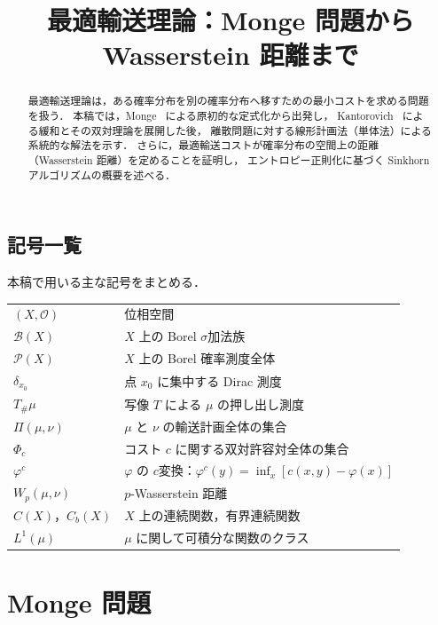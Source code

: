 \documentclass[uplatex, dvipdfmx]{jsarticle}
\title{最適輸送理論：Monge 問題から Wasserstein 距離まで}
\author{}
\date{}
\begin{document}
\maketitle

\begin{abstract}
最適輸送理論は，ある確率分布を別の確率分布へ移すための最小コストを求める問題を扱う．
本稿では，Monge~\cite{Monge1781} による原初的な定式化から出発し，
Kantorovich~\cite{Kantorovich1942} による緩和とその双対理論を展開した後，
離散問題に対する線形計画法（単体法）による系統的な解法を示す．
さらに，最適輸送コストが確率分布の空間上の距離（Wasserstein 距離）を定めることを証明し，
エントロピー正則化に基づく Sinkhorn アルゴリズムの概要を述べる．
\end{abstract}

\tableofcontents
\newpage

\subsection*{記号一覧}
本稿で用いる主な記号をまとめる．
\begin{tabular}{ll}
  $(X,\mathcal{O})$ & 位相空間 \\
  $\mathcal{B}(X)$ & $X$ 上の Borel $\sigma$加法族 \\
  $\mathcal{P}(X)$ & $X$ 上の Borel 確率測度全体 \\
  $\delta_{x_0}$ & 点 $x_0$ に集中する Dirac 測度 \\
  $T_\#\mu$ & 写像 $T$ による $\mu$ の押し出し測度 \\
  $\Pi(\mu,\nu)$ & $\mu$ と $\nu$ の輸送計画全体の集合 \\
  $\Phi_c$ & コスト $c$ に関する双対許容対全体の集合 \\
  $\varphi^c$ & $\varphi$ の $c$変換：$\varphi^c(y)=\inf_x[c(x,y)-\varphi(x)]$ \\
  $W_p(\mu,\nu)$ & $p$-Wasserstein 距離 \\
  $C(X)$，$C_b(X)$ & $X$ 上の連続関数，有界連続関数 \\
  $L^1(\mu)$ & $\mu$ に関して可積分な関数のクラス \\
\end{tabular}
\bigskip

\section{Monge 問題}
\end{document}
